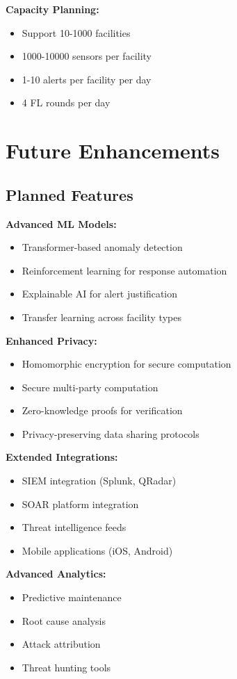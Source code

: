 \documentclass[12pt,a4paper]{article}
\begin{document}
\textbf{Capacity Planning:}
\begin{itemize}[leftmargin=1cm,itemsep=0pt]
    \item Support 10-1000 facilities
    \item 1000-10000 sensors per facility
    \item 1-10 alerts per facility per day
    \item 4 FL rounds per day
\end{itemize}

\section{Future Enhancements}

\subsection{Planned Features}

\textbf{Advanced ML Models:}
\begin{itemize}[leftmargin=1cm,itemsep=0pt]
    \item Transformer-based anomaly detection
    \item Reinforcement learning for response automation
    \item Explainable AI for alert justification
    \item Transfer learning across facility types
\end{itemize}

\textbf{Enhanced Privacy:}
\begin{itemize}[leftmargin=1cm,itemsep=0pt]
    \item Homomorphic encryption for secure computation
    \item Secure multi-party computation
    \item Zero-knowledge proofs for verification
    \item Privacy-preserving data sharing protocols
\end{itemize}

\textbf{Extended Integrations:}
\begin{itemize}[leftmargin=1cm,itemsep=0pt]
    \item SIEM integration (Splunk, QRadar)
    \item SOAR platform integration
    \item Threat intelligence feeds
    \item Mobile applications (iOS, Android)
\end{itemize}

\textbf{Advanced Analytics:}
\begin{itemize}[leftmargin=1cm,itemsep=0pt]
    \item Predictive maintenance
    \item Root cause analysis
    \item Attack attribution
    \item Threat hunting tools
\end{itemize}
\end{document}
